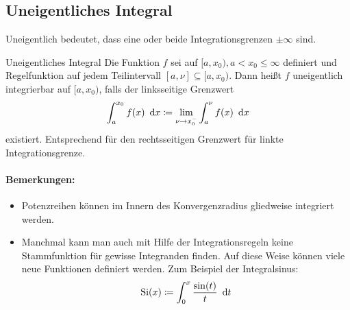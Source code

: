 \subsection{Uneigentliches Integral}
Uneigentlich bedeutet, dass eine oder beide Integrationsgrenzen $\pm\infty$ sind.
\begin{definition}{Uneigentliches Integral}
	Die Funktion $f$ sei auf $[a,x_0), a<x_0\leq\infty$ definiert und Regelfunktion auf jedem Teilintervall $[a,\nu]\subseteq [a,x_0)$. Dann heißt $f$ uneigentlich integrierbar auf $[a,x_0)$, falls der linksseitige Grenzwert
	\begin{equation*}
		\int_a^{x_0} f(x)\ \operatorname{d}\! x\coloneqq \lim\limits_{\nu\to x_0^-}\int_a^\nu f(x)\ \operatorname{d}\! x
	\end{equation*}
	existiert. Entsprechend für den rechtsseitigen Grenzwert für linkte Integrationsgrenze.
\end{definition}
\paragraph{Bemerkungen:}
\begin{itemize}
	\item Potenzreihen können im Innern des Konvergenzradius gliedweise integriert werden.
	\item Manchmal kann man auch mit Hilfe der Integrationsregeln keine Stammfunktion für gewisse Integranden finden. Auf diese Weise können viele neue Funktionen definiert werden. Zum Beispiel der Integralsinus:
	\begin{equation*}
		\operatorname{Si}(x)\coloneqq \int_0^x \frac{\sin(t)}{t}\ \operatorname{d}\! t
	\end{equation*}
\end{itemize}
